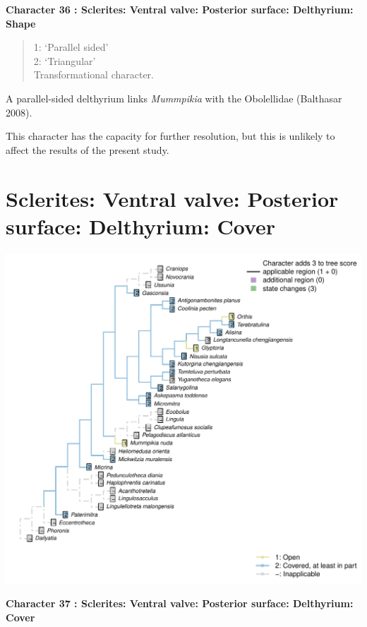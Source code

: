 \documentclass[]{book}
\theoremstyle{definition}
\theoremstyle{definition}
\theoremstyle{definition}
\theoremstyle{remark}
\begin{document}
\textbf{Character 36 : Sclerites: Ventral valve: Posterior surface:
Delthyrium: Shape }

\begin{quote}
1: `Parallel sided'\\
2: `Triangular'\\
Transformational character.
\end{quote}

A parallel-sided delthyrium links \emph{Mummpikia} with the Obolellidae
(Balthasar 2008).

This character has the capacity for further resolution, but this is
unlikely to affect the results of the present study.

\hypertarget{sclerites-ventral-valve-posterior-surface-delthyrium-cover}{%
\section*{Sclerites: Ventral valve: Posterior surface: Delthyrium:
Cover}\label{sclerites-ventral-valve-posterior-surface-delthyrium-cover}}

\includegraphics{Brachiopod_phylogeny_files/figure-latex/unnamed-chunk-5-37.pdf}

\textbf{Character 37 : Sclerites: Ventral valve: Posterior surface:
Delthyrium: Cover }
\end{document}
